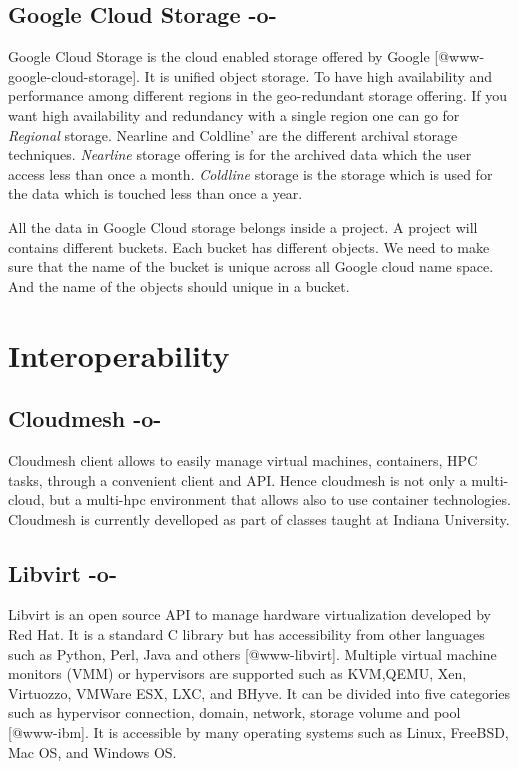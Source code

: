 \subsection{Google Cloud Storage -o-}

Google Cloud Storage is the cloud enabled storage offered by
Google [@www-google-cloud-storage]. It is unified object
storage. To have high availability and performance among different
regions in the geo-redundant storage offering. If you want high
availability and redundancy with a single region one can go for
\textit{Regional} storage. Nearline and Coldline' are the different
archival storage techniques. \textit{Nearline} storage offering is for
the archived data which the user access less than once a
month. \textit{Coldline} storage is the storage which is used for the
data which is touched less than once a year.

All the data in Google Cloud storage belongs inside a project. A
project will contains different buckets. Each bucket has different
objects. We need to make sure that the name of the bucket is unique
across all Google cloud name space. And the name of the objects should
unique in a bucket.




\section{Interoperability}


\subsection{Cloudmesh -o-}

Cloudmesh client allows to easily manage virtual machines, containers,
HPC tasks, through a convenient client and API. Hence cloudmesh is not
only a multi-cloud, but a multi-hpc environment that allows also to
use container technologies. Cloudmesh is currently develloped as part
of classes taught at Indiana University.



\subsection{Libvirt -o-}

Libvirt is an open source API to manage hardware virtualization
developed by Red Hat.  It is a standard C library but has
accessibility from other languages such as Python, Perl, Java and
others [@www-libvirt]. Multiple virtual machine monitors (VMM) or
hypervisors are supported such as KVM,QEMU, Xen, Virtuozzo, VMWare
ESX, LXC, and BHyve.  It can be divided into five categories such as
hypervisor connection, domain, network, storage volume and
pool [@www-ibm]. It is accessible by many operating systems such
as Linux, FreeBSD, Mac OS, and Windows OS.


